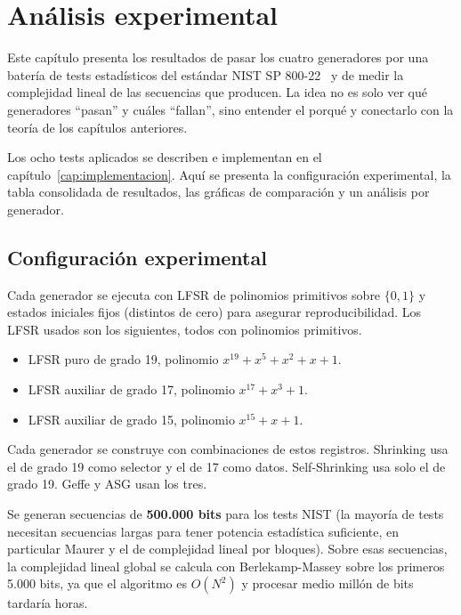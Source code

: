 \chapter{Análisis experimental}
\label{cap:analisis}

Este capítulo presenta los resultados de pasar los cuatro generadores por una batería de tests estadísticos del estándar NIST SP 800-22~\cite{nist2010}
y de medir la complejidad lineal de las secuencias que producen. La idea no es solo ver qué generadores ``pasan'' y cuáles ``fallan'',
sino entender el porqué y conectarlo con la teoría de los capítulos anteriores.

Los ocho tests aplicados se describen e implementan en el capítulo~\ref{cap:implementacion}.
Aquí se presenta la configuración experimental, la tabla consolidada de resultados, las gráficas de comparación y un análisis por generador.

\section{Configuración experimental}

Cada generador se ejecuta con LFSR de polinomios primitivos sobre $\{0, 1\}$ y estados iniciales fijos (distintos de cero) para asegurar reproducibilidad.
Los LFSR usados son los siguientes, todos con polinomios primitivos.

\begin{itemize}
  \item LFSR puro de grado 19, polinomio $x^{19} + x^{5} + x^2 + x + 1$.
  \item LFSR auxiliar de grado 17, polinomio $x^{17} + x^3 + 1$.
  \item LFSR auxiliar de grado 15, polinomio $x^{15} + x + 1$.
\end{itemize}

Cada generador se construye con combinaciones de estos registros. Shrinking usa el de grado 19 como selector y el de 17 como datos.
Self-Shrinking usa solo el de grado 19. Geffe y ASG usan los tres.

Se generan secuencias de \textbf{500.000 bits} para los tests NIST
(la mayoría de tests necesitan secuencias largas para tener potencia estadística suficiente, en particular Maurer y el de complejidad lineal por bloques).
Sobre esas secuencias, la complejidad lineal global se calcula con Berlekamp-Massey sobre los primeros 5.000 bits, ya que el algoritmo es $O(N^2)$
y procesar medio millón de bits tardaría horas.

